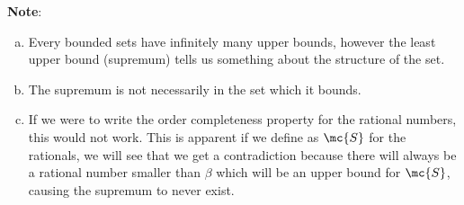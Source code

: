 \textbf{Note}:

\begin{enumerate}[(a)]
	\item Every bounded sets have infinitely many upper bounds, however the least upper bound (supremum) tells us something about the structure of the set.
	
	\item The supremum is not necessarily in the set which it bounds.
	
	\item If we were to write the order completeness property for the rational numbers, this would not work. This is apparent if we define as \(\mc{S}\) for the rationals, we will see that we get a contradiction because there will always be a rational number smaller than \(\beta\) which will be an upper bound for \(\mc{S}\), causing the supremum to never exist.
\end{enumerate}

